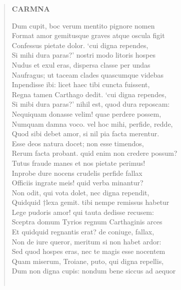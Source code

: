 \documentclass[11pt, a4paper]{report}
\begin{document}
\begin{verse}
     \marginpar{[118]} \begin{center} \textbf{CARMNA} \end{center}Dum cupit, boc verum mentito pignore nomen \\ Format amor gemitusque graves atque oscula figit \\ Confessus pietate dolor. ‘cui digna rependes, \\ Si mihi dura paras?’ nostri modo litoris hospes \\ Nudus et exul eras, dispersa classe per undas \\ Naufragus; ut taceam clades quascumque videbas \\ Inpendisse ibi: licet haec tibi cuncta fuissent, \\ Regna tamen Carthago dedit. ‘cui digna rependes, \\ Si mibi dura paras?’ nihil est, quod dura reposcam: \\ Nequiquam donasse velim! quae perdere possem, \\ Numquam damna voco. vel hoc mihi, perfide, redde, \\ Quod sibi debet amor, si nil pia facta merentur. \\ Esse deos natura docet; non esse timendos, \\ Rerum facta probant. quid enim non credere possum? \\ Tutus fraude manes et nos pietate perimus! \\ Inprobe dure nocens crudelis perfide fallax \\ Officiis ingrate meis! quid verba minantur? \\ Non odit, qui vota dolet, nec digna rependit, \\ Quidquid †lexa gemit. tibi nempe remissus habetur \\ Lege pudoris amor! qui tauta dedisse recusem: \\ Sceptra domum Tyrios regnum Carthaginis arces \\ Et quidquid regnantis erat? de coniuge, fallax, \\ Non de iure queror, meritum si non habet ardor: \\ Sed quod hospes eras, nec te magis esse nocentem \\ Quam miserum, Troiane, puto, qui digna repellis, \\ Dum non digna cupis: nondum bene siccus ad aequor \\ 
        ﻿\pagebreak 

\end{verse}
\end{document}
